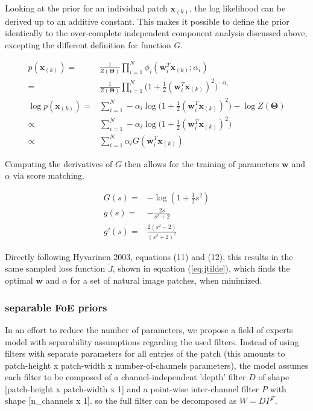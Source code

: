 \documentclass{article}
\begin{document}
Looking at the prior for an individual patch $\mathbf{x}_{(k)}$, the log likelihood can be derived up to an additive constant. This makes it possible to define the prior identically to the over-complete independent component analysis discussed above, excepting the different definition for function $G$. 

\begin{equation}
\begin{aligned}
	p(\mathbf{x}_{(k)}) =& \frac{1}{Z(\bm{\Theta})} \prod_{i=1}^{N} \phi_i (\mathbf{w}_i^T \mathbf{x}_{(k)} ; \alpha_i) \\
	=& \frac{1}{Z(\bm{\Theta})} \prod_{i=1}^{N} \bigg( 1 + \frac{1}{2}(\mathbf{w}_i^T \mathbf{x}_{(k)})^2 \bigg)^{-\alpha_i} \\
	\log p(\mathbf{x}_{(k)}) =& \sum_{i=1}^{N} -\alpha_i \log \bigg( 1 + \frac{1}{2}(\mathbf{w}_i^T \mathbf{x}_{(k)})^2 \bigg)  - \log Z(\bm{\Theta}) \\
	\propto& \sum_{i=1}^{N} -\alpha_i \log \bigg( 1 + \frac{1}{2}(\mathbf{w}_i^T \mathbf{x}_{(k)})^2 \bigg) \\
		\propto& \sum_{i=1}^{N} \alpha_i G(\mathbf{w}_i^T \mathbf{x}_{(k)})
\end{aligned}
\end{equation}

Computing the derivatives of $G$ then allows for the training of parameters $\mathbf{w}$ and $\alpha$ via score matching.


\begin{equation}
\begin{aligned}
	G(s) =& - \log(1 + \frac{1}{2} s^2) \\
	g(s) =& - \frac{2s}{s^2 + 2} \\
	g'(s) =& \frac{2(s^2 - 2)}{(s^2 + 2)^2}
\end{aligned}
\end{equation}

Directly following Hyvarinen 2003, equations (11) and (12), this results in the same sampled loss function $\tilde{J}$, shown in equation (\ref{eq:jtilde}), which finds the optimal $\mathbf{w}$ and $\alpha$ for a set of natural image patches, when minimized.

\subsubsection{separable FoE priors}

In an effort to reduce the number of parameters, we propose a field of experts model with separability assumptions regarding the used filters. Instead of using filters with separate parameters for all entries of the patch (this amounts to patch-height x patch-width x number-of-channels parameters), the model assumes each filter to be composed of a channel-independent 'depth' filter $D$ of shape [patch-height x patch-width x 1] and a point-wise inter-channel filter $P$ with shape [n\_channels x 1]. so the full filter can be decomposed as $W = DP^T$.
\end{document}
